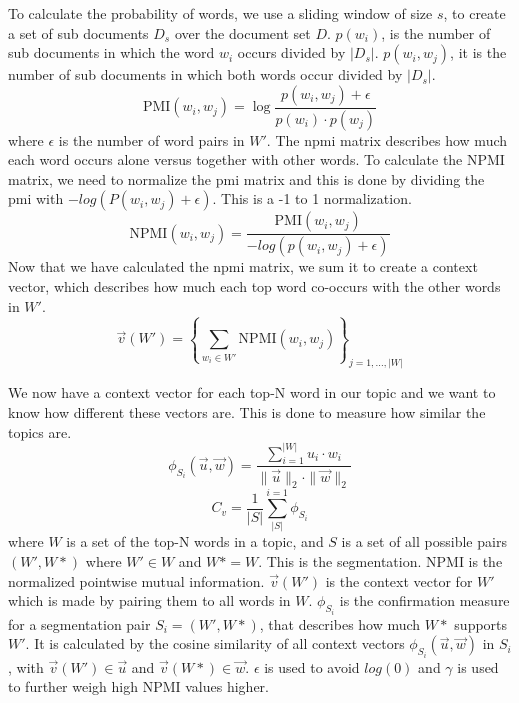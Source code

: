 To calculate the probability of words, we use a sliding window of size $s$, to create a set of sub documents $D_s$ over the document set $D$.
$p(w_i)$, is the number of sub documents in which the word $w_i$ occurs divided by $|D_s|$.
$p(w_i, w_j)$, it is the number of sub documents in which both words occur divided by $|D_s|$. 
\begin{equation}\label{eq:pmi}
	\text{PMI}(w_i,w_j) = \log\frac{p(w_i,w_j) + \epsilon}{p(w_i)\cdot p(w_j)}
\end{equation}
where $\epsilon$ is the number of word pairs in $W'$. 
The \gls{npmi} matrix describes how much each word occurs alone versus together with other words. 
To calculate the NPMI matrix, we need to normalize the \gls{pmi} matrix and this is done by dividing the \gls{pmi} with $-log(P(w_i,w_j) + \epsilon)$.
This is a -1 to 1 normalization.
\begin{equation}\label{eq:coherence_2}
	\text{NPMI}(w_i,w_j) =  \frac{\text{PMI}(w_i, w_j)}{-log(p(w_i,w_j) + \epsilon)}
\end{equation}
Now that we have calculated the \gls{npmi} matrix, we sum it to create a context vector, which describes how much each top word co-occurs with the other words in $W'$.
\begin{equation}\label{eq:coherence_1}
	\overrightarrow{v}(W') = \left\{ \sum_{w_i \in W'} \text{NPMI}(w_i, w_j) \right\}_{j=1,\dots,|W|}
\end{equation}

We now have a context vector for each top-N word in our topic and we want to know how different these vectors are.
This is done to measure how similar the topics are.
\begin{equation}\label{eq:coherence_3}
	\phi_{S_i}(\overrightarrow{u}, \overrightarrow{w}) = \frac
	{\sum_{i = 1}^{|W|} u_i \cdot w_i}
	{\|\overrightarrow{u}\|_2 \cdot \|\overrightarrow{w}\|_2}
\end{equation}
\begin{equation}\label{eq:coherence_4}
	C_v = \frac{1}{|S|}\sum_{|S|}^{i=1}\phi_{S_i}
\end{equation}
\noindent where $W$ is a set of the top-N words in a topic, and $S$ is a set of all possible pairs $(W',W*)$ where $W'\in W$ and $W* = W$.
This is the segmentation.
NPMI is the normalized pointwise mutual information.
$\overrightarrow{v}(W')$ is the context vector for $W'$ which is made by pairing them to all words in $W$.
$\phi_{S_i}$ is the confirmation measure for a segmentation pair $S_i = (W',W*)$, that describes how much $W*$ supports $W'$.
It is calculated by the cosine similarity of all context vectors $\phi_{S_i}(\overrightarrow{u},\overrightarrow{w})$ in $S_i$, with $\overrightarrow{v}(W') \in \overrightarrow{u}$ and $\overrightarrow{v}(W*) \in \overrightarrow{w}$.
$\epsilon$ is used to avoid $log(0)$ and $\gamma$ is used to further weigh high NPMI values higher.

